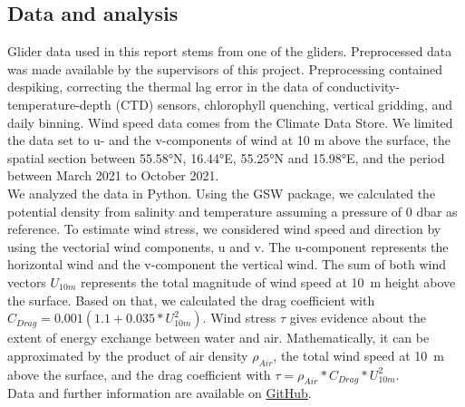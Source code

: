 \documentclass[../Main.tex]{subfiles}
\begin{document}
\subsection*{\crule[blue]{.2cm}{.2cm} Data and analysis}
Glider data used in this report stems from one of the gliders. 
Preprocessed data was made available by the supervisors of this project. 
Preprocessing contained despiking, correcting the thermal lag error in the data of conductivity-temperature-depth (CTD) sensors, chlorophyll quenching, vertical gridding, and daily binning. 
Wind speed data comes from the Climate Data Store\supercite{era}. 
We limited the data set to u- and the v-components of wind at 10 m above the surface, the spatial section between 55.58°N, 16.44°E, 55.25°N and 15.98°E, and the period between March 2021 to October 2021.
\\
We analyzed the data in Python. Using the GSW package, we calculated the potential density from salinity and temperature assuming a pressure of 0 dbar as reference\supercite{gsw}. 
To estimate wind stress, we considered wind speed and direction by using the vectorial wind components, u and v.
The u-component represents the horizontal wind and the v-component the vertical wind. 
The sum of both wind vectors $U_{10m}$ represents the total magnitude of wind speed at \SI{10}{m} height above the surface. Based on that, we calculated the drag coefficient with $C_{Drag} = 0.001(1.1+0.035*U_{10m}^2)$. 
Wind stress $\tau$ gives evidence about the extent of energy exchange between water and air.
Mathematically, it can be approximated by the product of air density $\rho_{Air}$, the total wind speed at \SI{10}{m} above the surface, and the drag coefficient with $\tau = \rho_{Air}*C_{Drag}*U_{10m}^2$\supercite{Mehrfar2018}.
\\
Data and further information are available on \href{https://github.com/joaldi2208/BloomDynamics}{GitHub}.
\end{document}
